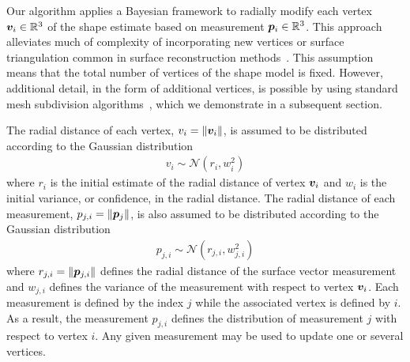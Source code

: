 Our algorithm applies a Bayesian framework to radially modify each vertex \( \bm{v}_i \in \mathbb{R}^3\) of the shape estimate based on measurement \( \bm{p}_i \in \mathbb{R}^3 \). 
This approach alleviates much of complexity of incorporating new vertices or surface triangulation common in surface reconstruction methods~\cite{berg2008}.
This assumption means that the total number of vertices of the shape model is fixed.
However, additional detail, in the form of additional vertices, is possible by using standard mesh subdivision algorithms~\cite{orourke1998}, which we demonstrate in a subsequent section.

The radial distance of each vertex, \( v_i = \left\| \bm{v}_i \right\|\), is assumed to be distributed according to the Gaussian distribution
\begin{align*}
    v_i \sim \mathcal{N}(r_i, w_i^2)
\end{align*}
where \( r_i \) is the initial estimate of the radial distance of vertex \( \bm{v}_i\) and \( w_i \) is the initial variance, or confidence, in the radial distance.
The radial distance of each measurement, \( p_{j,i} = \left\| \bm{p}_j \right\|\), is also assumed to be distributed according to the Gaussian distribution
\begin{align*}
    p_{j,i} \sim \mathcal{N}(r_{j,i}, w_{j,i}^2)
\end{align*}
where \( r_{j,i} = \left\| \bm{p}_{j,i} \right\| \) defines the radial distance of the surface vector measurement and \( w_{j, i}\) defines the variance of the measurement with respect to vertex \( \bm{v}_i\).
Each measurement is defined by the index \( j \) while the associated vertex is defined by \( i \). 
As a result, the measurement \( p_{j, i} \) defines the distribution of measurement \( j \) with respect to vertex \( i \). 
Any given measurement may be used to update one or several vertices.

